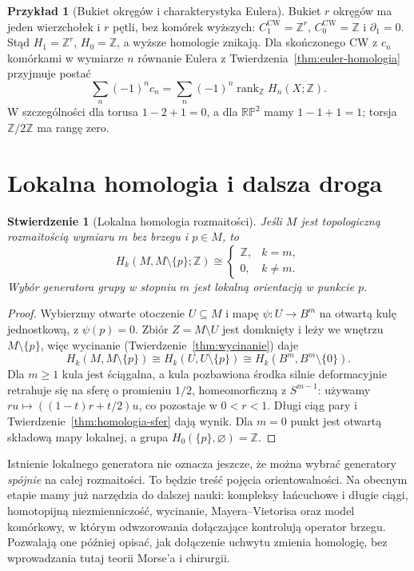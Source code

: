 \documentclass[11pt,a4paper,oneside]{report}
\newcommand{\Z}{\mathbb{Z}}
\theoremstyle{plain}
\newtheorem{stwierdzenie}[twierdzenie]{Stwierdzenie}
\theoremstyle{definition}
\newtheorem{przyklad}[twierdzenie]{Przykład}
\theoremstyle{remark}
\begin{document}
\begin{przyklad}[Bukiet okręgów i charakterystyka Eulera]
\label{prz:homologia-bukiet}
Bukiet $r$ okręgów ma jeden
wierzchołek i $r$ pętli,
bez komórek wyższych:
$C_1^{\mathrm{CW}}=\Z^r$,
$C_0^{\mathrm{CW}}=\Z$ i
$\partial_1=0$.
Stąd $H_1=\Z^r$, $H_0=\Z$,
a wyższe homologie znikają.
Dla skończonego CW z
$c_n$ komórkami w wymiarze $n$
równanie Eulera z
Twierdzenia~\ref{thm:euler-homologia}
przyjmuje postać
\[
 \sum_n(-1)^n c_n
 =\sum_n(-1)^n
   \operatorname{rank}_{\Z} H_n(X;\Z).
\]
W szczególności dla torusa
$1-2+1=0$, a dla
$\mathbb{RP}^2$ mamy
$1-1+1=1$; torsja
$\Z/2\Z$ ma rangę zero.
\end{przyklad}

\section{Lokalna homologia i dalsza droga}
\label{sec:lokalna-homologia}

\begin{stwierdzenie}[Lokalna homologia rozmaitości]
\label{prop:lokalna-homologia}
Jeśli $M$ jest topologiczną
rozmaitością wymiaru $m$
bez brzegu i $p\in M$, to
\[
 H_k(M,M\setminus\{p\};\Z)
 \cong
 \begin{cases}\Z,&k=m,\\0,&k\ne m.\end{cases}
\]
Wybór generatora grupy w stopniu $m$
jest \emph{lokalną orientacją}
w punkcie $p$.
\end{stwierdzenie}
\begin{proof}
Wybierzmy otwarte otoczenie $U\subseteq M$ i mapę
$\psi:U\to B^m$ na otwartą kulę jednostkową,
z $\psi(p)=0$. Zbiór
$Z=M\setminus U$
jest domknięty i leży
we wnętrzu $M\setminus\{p\}$,
więc wycinanie
(Twierdzenie~\ref{thm:wycinanie})
daje
\[
 H_k(M,M\setminus\{p\})
 \cong H_k(U,U\setminus\{p\})
\cong H_k(B^m,B^m\setminus\{0\}).
\]
Dla $m\geq1$ kula jest
ściągalna, a kula pozbawiona
środka silnie deformacyjnie retrahuje się na sferę
o promieniu $1/2$, homeomorficzną z $S^{m-1}$:
używamy $ru\mapsto((1-t)r+t/2)u$, co pozostaje w $0<r<1$.
Długi ciąg pary i
Twierdzenie~\ref{thm:homologia-sfer}
dają wynik. Dla $m=0$
punkt jest otwartą składową
mapy lokalnej, a grupa
$H_0(\{p\},\varnothing)=\Z$.
\end{proof}

Istnienie lokalnego generatora
nie oznacza jeszcze, że można
wybrać generatory \emph{spójnie}
na całej rozmaitości. To będzie
treść pojęcia orientowalności.
Na obecnym etapie mamy
już narzędzia do dalszej nauki:
kompleksy łańcuchowe i długie ciągi,
homotopijną niezmienniczość,
wycinanie, Mayera--Vietorisa
oraz model komórkowy, w którym
odwzorowania dołączające kontrolują
operator brzegu. Pozwalają one
później opisać, jak dołączenie
uchwytu zmienia homologię,
bez wprowadzania tutaj
teorii Morse'a i chirurgii.
\end{document}
